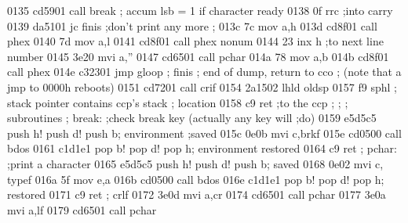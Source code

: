 0135 cd5901                          call break
                            ;        accum lsb = 1 if character ready
0138 0f                              rrc            ;into carry
0139 da5101                          jc   finis     ;don't print any more
                            ;
013c 7c                              mov  a,h
013d cd8f01                          call phex
0140 7d                              mov  a,l
0141 cd8f01                          call phex
                            nonum
0144 23                              inx  h         ;to next line number
0145 3e20                            mvi  a,''
0147 cd6501                          call pchar
014a 78                              mov  a,b
014b cd8f01                          call phex
014e c32301                          jmp  gloop
                            ;
                            finis
                            ;        end of dump, return to cco
                            ;        (note that a jmp to 0000h reboots)
0151 cd7201                          call crif
0154 2a1502                          lhld oldsp
0157 f9                              sphl
                            ;        stack pointer contains ccp's stack
                            ;        location
0158 c9                              ret            ;to the ccp
                            ;
                            ;
                            ;        subroutines
                            ;
                            break:   ;check break key (actually any key will
                                     ;do)
0159 e5d5c5                          push h! push d! push b; environment
                                     ;saved
015c 0e0b                            mvi  c,brkf
015e cd0500                          call bdos
0161 c1d1e1                          pop b! pop d! pop h; environment
                                     restored
0164 c9                              ret
                            ;
                            pchar:   ;print a character
0165 e5d5c5                          push h! push d! push b; saved
0168 0e02                            mvi  c, typef
016a 5f                              mov  e,a
016b cd0500                          call bdos
016e c1d1e1                          pop b! pop d! pop h; restored
0171 c9                              ret
                            ;
                            crlf
0172 3e0d                            mvi  a,cr
0174 cd6501                          call pchar
0177 3e0a                            mvi  a,lf
0179 cd6501                          call pchar
